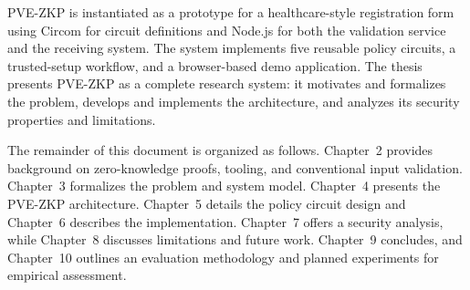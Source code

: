 PVE-ZKP is instantiated as a prototype for a healthcare-style registration form
using Circom for circuit definitions and Node.js for both the validation
service and the receiving system. The system implements five reusable policy
circuits, a trusted-setup workflow, and a browser-based demo application. The
thesis presents PVE-ZKP as a complete research system: it motivates and
formalizes the problem, develops and implements the architecture, and analyzes
its security properties and limitations.

The remainder of this document is organized as follows. Chapter~2 provides
background on zero-knowledge proofs, tooling, and conventional input
validation. Chapter~3 formalizes the problem and system model. Chapter~4
presents the PVE-ZKP architecture. Chapter~5 details the policy circuit design
and Chapter~6 describes the implementation. Chapter~7 offers a security
analysis, while Chapter~8 discusses limitations and future work. Chapter~9
concludes, and Chapter~10 outlines an evaluation methodology and planned
experiments for empirical assessment.
